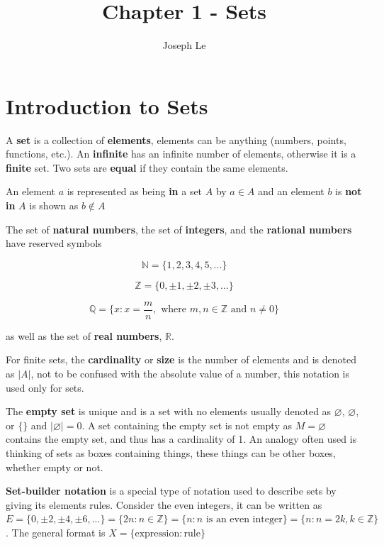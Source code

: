 \documentclass[10pt]{article}
\newcommand{\Z}{\mathbb{Z}}
\theoremstyle{definition}
\begin{document}

\title{Chapter 1 - Sets}
\author{Joseph Le}

\maketitle

\section{Introduction to Sets}

A \textbf{set} is a collection of \textbf{elements}, elements can be anything (numbers, points, functions, etc.). An \textbf{infinite} has an infinite number of elements, otherwise it is a \textbf{finite} set. Two sets are \textbf{equal} if they contain the same elements.

An element $a$ is represented as being \textbf{in} a set $A$ by $a \in A$ and an element $b$ is \textbf{not in} $A$ is shown as $b \notin A$

The set of \textbf{natural numbers}, the set of \textbf{integers}, and the \textbf{rational numbers} have reserved symbols

$$ \mathbb N = \{ 1,2,3,4,5,...\} $$

$$ \mathbb Z = \{ 0, \pm 1, \pm 2, \pm 3, ... \} $$

$$ \mathbb Q = \{ x : x = \frac{m}{n}, \text{ where } m,n \in \Z \text{ and } n \neq 0 \} $$

\noindent as well as the set of \textbf{real numbers}, $\mathbb R$.

For finite sets, the \textbf{cardinality} or \textbf{size} is the number of elements and is denoted as $|A|$, not to be confused with the absolute value of a number, this notation is used only for sets.

The \textbf{empty set} is unique and is a set with no elements usually denoted as $\varnothing$, $\varnothing$, or $\{\}$ and $|\varnothing| = 0$. A set containing the empty set is not empty as $M = {\varnothing}$ contains the empty set, and thus has a cardinality of 1. An analogy often used is thinking of sets as boxes containing things, these things can be other boxes, whether empty or not.

\textbf{Set-builder notation} is a special type of notation used to describe sets by giving its elements rules. Consider the even integers, it can be written as $E = \{0, \pm 2, \pm 4, \pm 6,...\} = \{2n: n \in \mathbb Z\} = \{ n : n \text{ is an even integer} \}= \{ n : n = 2k, k \in \Z \}$. The general format is $X = \{ \text{expression} : \text{rule} \}$
\end{document}

